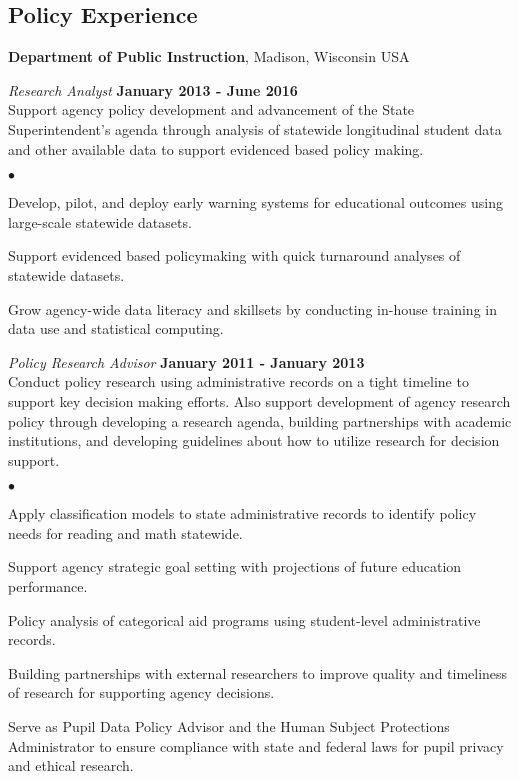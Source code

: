 \documentclass[margin,line]{res}
\newenvironment{list2}{
  \begin{list}{$\bullet$}{%
      \setlength{\itemsep}{0in}
      \setlength{\parsep}{0in} \setlength{\parskip}{0in}
      \setlength{\topsep}{0in} \setlength{\partopsep}{0in} 
      \setlength{\leftmargin}{0.2in}}}{\end{list}}
\begin{document}
\begin{resume}
\section{\sc Policy Experience}
{\bf Department of Public Instruction}, Madison, Wisconsin USA

\vspace{-.3cm}
{\em Research Analyst} \hfill {\bf January 2013 - June 2016}\\
Support agency policy development and advancement of the State Superintendent's agenda through analysis of statewide longitudinal student data and other available data to support evidenced based policy making. 
\begin{list2}
\item Develop, pilot, and deploy early warning systems for educational outcomes using large-scale statewide datasets. 
\item Support evidenced based policymaking with quick turnaround analyses of statewide datasets. 
\item Grow agency-wide data literacy and skillsets by conducting in-house training in data use and statistical computing.
\end{list2}

\vspace{-.3cm}
{\em Policy Research Advisor} \hfill {\bf January 2011 - January 2013}\\
Conduct policy research using administrative records on a tight timeline to support key decision making efforts. Also support development of agency research policy through developing a research agenda, building partnerships with academic institutions, and developing guidelines about how to utilize research for decision support.
\begin{list2}
\item Apply classification models to state administrative records to identify policy needs for reading and math statewide.
\item Support agency strategic goal setting with projections of future education performance.
\item Policy analysis of categorical aid programs using student-level administrative records.
\item Building partnerships with external researchers to improve quality and timeliness of research for supporting agency decisions.
\item Serve as Pupil Data Policy Advisor and the Human Subject Protections Administrator to ensure compliance with state and federal laws for pupil privacy and ethical research.
\end{list2}


\end{resume}
\end{document}
